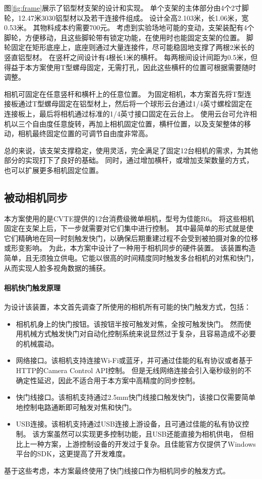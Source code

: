 图\ref{fig:frame}展示了铝型材支架的设计和实现。
单个支架的主体部分由4个2寸脚轮，12.47米3030铝型材以及若干连接件组成。
设计全高2.103米，长1.06米，宽0.53米。
其物料成本约需要700元。
考虑到实验场地可能的变动，支架装配有4个脚轮，方便移动，且这些脚轮带有锁定功能，在使用时也能固定支架的位置。
脚轮固定在矩形底座上，底座则通过大量连接件，尽可能稳固地支撑了两根2米长的竖直铝型材。
在竖杆之间设计有4根长1米的横杆。
每两根间设计间距为0.5米，但得益于本方案使用T型螺母固定，无需打孔，因此这些横杆的位置可根据需要随时调整。

相机可固定在任意竖杆和横杆上的任意位置。
为固定相机，本方案首先将T型连接板通过T型螺母固定在铝型材上，然后将一个球形云台通过1/4英寸螺栓固定在连接板上，最后将相机通过标准的1/4英寸接口固定在云台上。
使用云台可允许相机以三个自由度任意旋转，再加上相机固定位置，横杆位置，以及支架整体的移动，相机最终固定位置的可调节自由度非常高。

总的来说，该支架支撑稳定，使用灵活，完全满足了固定12台相机的需求，为其他部分的实现打下了良好的基础。
同时，通过增加横杆，或增加支架数量的方式，也可以扩展更多相机固定位置。

\subsection{被动相机同步}
\label{sec:passive_sync}

本方案使用的是CVTE提供的12台消费级微单相机，型号为佳能R6。
将这些相机固定在支架上后，下一步就需要对它们集中进行控制。
其中最简单的形式就是使它们精确地在同一时刻触发快门，以确保后期重建过程不会受到被拍摄对象的位移或形变影响。
为此，本方案中设计了一种用于相机同步的硬件装置。
该装置构造简单，且无须独立供电。它能以很高的时间精度同时触发多台相机的对焦和快门，从而实现人脸多视角数据的捕获。

\paragraph{相机快门触发原理}

为设计该装置，本文首先调查了所使用的相机所有可能的快门触发方式，包括：
\begin{itemize}
\item 相机机身上的快门按钮。该按钮半按可触发对焦，全按可触发快门。
然而使用机械方式触发快门对自动化控制系统来说显然过于复杂，且容易造成不必要的机械震动。
\item 网络接口。该相机支持连接Wi-Fi或蓝牙，并可通过佳能的私有协议或者基于HTTP的Camera Control API控制。
但是无线网络连接会引入毫秒级别的不确定性延迟，因此不适合用于本方案中高精度的同步控制。
\item 快门线接口。该相机支持通过2.5mm快门线接口触发快门，该接口仅需要简单地控制电路通断即可触发对焦和快门。
\item USB连接。该相机支持通过USB连接上游设备，且可通过佳能的私有协议控制。
该方案虽然可以实现更多控制功能，且USB还能直接为相机供电，
但相比上一种方案，上游控制设备的开发过于复杂。且佳能官方仅提供了Windows平台的SDK，这更提高了开发难度。
\end{itemize}
基于这些考虑，本方案最终使用了快门线接口作为相机同步的触发方式。


